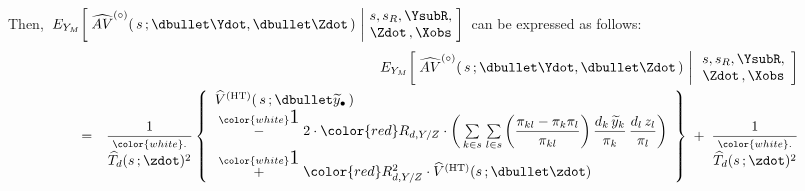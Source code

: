 \begin{lemma}
\begin{enumerate}
\begin{eqnarray*}
    \end{eqnarray*}
    Then,
    \,$
    E_{Y_{M}}\!\left[\;
        \widehat{AV}^{\textnormal{($\circ$)}}(\,s\,;\dbullet\Ydot,\dbullet\Zdot\,)
        \,\left\vert\!
        \begin{array}{c} s,s_{R},\YsubR, \\ \Zdot\,,\Xobs \end{array}
        \right.
        \!\!\right]
    $\,
    can be expressed as follows:
    \begin{eqnarray*}
    &&
        E_{Y_{M}}\!\left[\;
            \widehat{AV}^{\textnormal{($\circ$)}}(\,s\,;\dbullet\Ydot,\dbullet\Zdot\,)
            \,\left\vert\,
            \begin{array}{c}
                s,s_{R},\YsubR, \\ \Zdot\,,\Xobs
                \end{array}
            \right.
            \!\right]
    \\
    & = &
        \dfrac{
            1
            }{
            \overset{{\color{white}.}}{
                \widehat{T}_{d}(s\,;\zdot)^{2}
                }
            }
        \left\{\begin{array}{l}
            \widehat{V}^{\textnormal{(HT)}}(\,s\,;\dbullet\widetilde{y}_{\bullet}\,)
            \\
            \; \overset{{\color{white}\textnormal{\Large$1$}}}{-} \;
            2 \cdot {\color{red}R_{d,Y/Z}} \cdot
            \left(\,
                \underset{k \in s}{\sum}\;
                \underset{l \in s}{\sum}
                    \left(\dfrac{\pi_{kl}-\pi_{k}\pi_{l}}{\pi_{kl}}\right)
                    \dfrac{d_{k}\,\widetilde{y}_{k}}{\pi_{k}}\,
                    \dfrac{d_{l}\,z_{l}}{\pi_{l}}
                \right)
            \\
            \; \overset{{\color{white}\textnormal{\Large$1$}}}{+} \;
            {\color{red}R_{d,Y/Z}^{2}}
            \cdot
            \widehat{V}^{\textnormal{(HT)}}(s\,;\dbullet\zdot)
            \end{array}\right\}
        \; + \;
        \dfrac{
            1
            }{
            \overset{{\color{white}.}}{
                \widehat{T}_{d}(s\,;\zdot)^{2}
}}
\end{eqnarray*}
\end{enumerate}
\end{lemma}
